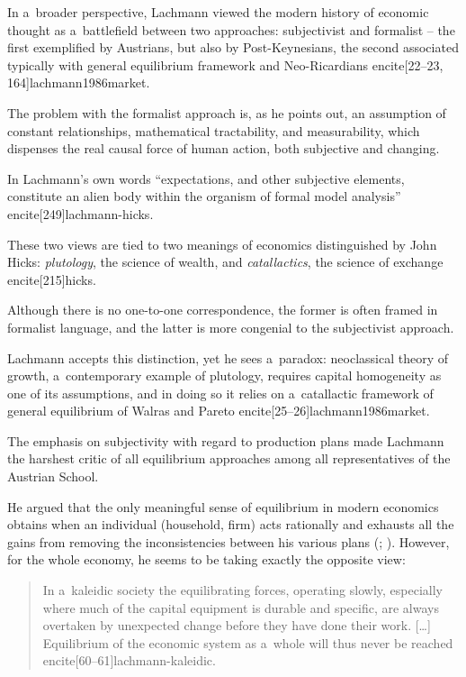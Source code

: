 {In a~broader perspective, Lachmann viewed the modern history of economic thought as a~battlefield between two approaches: subjectivist and formalist -- the first exemplified by Austrians, but also by Post-Keynesians, the second associated typically with general equilibrium framework and Neo-Ricardians encite[22--23, 164]{lachmann1986market}.

The problem with the formalist approach is, as he points out, an assumption of constant relationships, mathematical tractability, and measurability, which dispenses the real causal force of human action, both subjective and changing.

In Lachmann's own words ``expectations, and other subjective elements, constitute an alien body within the organism of formal model analysis'' encite[249]{lachmann-hicks}.



These two views are tied to two meanings of economics distinguished by John Hicks: \emph{plutology}, the science of wealth, and \emph{catallactics}, the science of exchange encite[215]{hicks}.

Although there is no one-to-one correspondence, the former is often framed in formalist language, and the latter is more congenial to the subjectivist approach.

Lachmann accepts this distinction, yet he sees a~paradox: neoclassical theory of growth, a~contemporary example of plutology, requires capital homogeneity as one of its assumptions, and in doing so it relies on a~catallactic framework of general equilibrium of Walras and Pareto encite[25--26]{lachmann1986market}.



The emphasis on subjectivity with regard to production plans made Lachmann the harshest critic of all equilibrium approaches among all representatives of the Austrian School.

He argued that the only meaningful sense of equilibrium in modern economics obtains when an individual (household, firm) acts rationally and exhausts all the gains from removing the inconsistencies between his various plans (\cite[15]{lachmann1973macro}; \citeyear[141]{lachmann1986market}). However, for the whole economy, he seems to be taking exactly the opposite view:

\begin{quote}

In a~kaleidic society the equilibrating forces, operating slowly, especially where much of the capital equipment is durable and specific, are always overtaken by unexpected change before they have done their work. [\ldots] Equilibrium of the economic system as a~whole will thus never be reached encite[60--61]{lachmann-kaleidic}.


\end{quote}}
